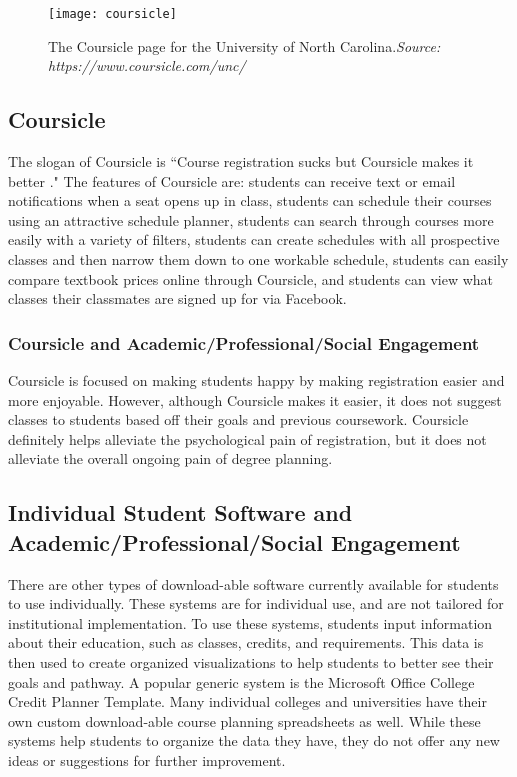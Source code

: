 \begin{figure}[h]
\centering
\texttt{[image: coursicle]}
\caption{The Coursicle page for the University of North Carolina.\textit{Source: https://www.coursicle.com/unc/}}
\end{figure}
\subsection{Coursicle}
The slogan of Coursicle is ``Course registration sucks but Coursicle makes it better  \cite{Coursicle}." The features of Coursicle are: students can receive text or email notifications when a seat opens up in class, students can schedule their courses using an attractive schedule planner, students can search through courses more easily with a variety of filters, students can create schedules with all prospective classes and then narrow them down to one workable schedule, students can easily compare textbook prices online through Coursicle, and students can view what classes their classmates are signed up for via Facebook. 

\subsubsection{Coursicle and Academic/Professional/Social Engagement}
Coursicle is focused on making students happy by making registration easier and more enjoyable. However, although Coursicle makes it easier, it does not suggest classes to students based off their goals and previous coursework. Coursicle definitely helps alleviate the psychological pain of registration, but it does not alleviate the overall ongoing pain of degree planning. 

\subsection{Individual Student Software and Academic/Professional/Social Engagement}
There are other types of download-able software currently available for students to use individually. These systems are for individual use, and are not tailored for institutional implementation. To use these systems, students input information about their education, such as classes, credits, and requirements. This data is then used to create organized visualizations to help students to better see their goals and pathway. A popular generic system is the Microsoft Office College Credit Planner Template. Many individual colleges and universities have their own custom download-able course planning spreadsheets as well. While these systems help students to organize the data they have, they do not offer any new ideas or suggestions for further improvement.

